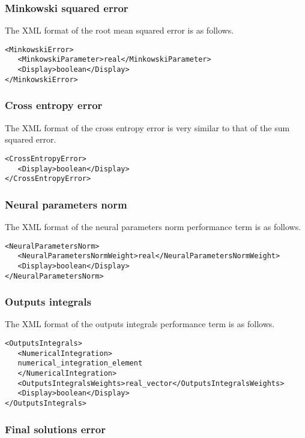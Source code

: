 \subsubsection*{Minkowski squared error}

The XML format of the root mean squared error is as follows.

\begin{lstlisting}
<MinkowskiError>
   <MinkowskiParameter>real</MinkowskiParameter>
   <Display>boolean</Display>
</MinkowskiError>
\end{lstlisting}

\subsubsection*{Cross entropy error}

The XML format of the cross entropy error is very similar to that of the sum squared error.

\begin{lstlisting}
<CrossEntropyError>
   <Display>boolean</Display>
</CrossEntropyError>
\end{lstlisting}

\subsubsection*{Neural parameters norm}

The XML format of the neural parameters norm performance term is as follows.

\begin{lstlisting}
<NeuralParametersNorm>
   <NeuralParametersNormWeight>real</NeuralParametersNormWeight>
   <Display>boolean</Display>
</NeuralParametersNorm>
\end{lstlisting}

\subsubsection*{Outputs integrals}

The XML format of the outputs integrals performance term is as follows.

\begin{lstlisting}
<OutputsIntegrals>
   <NumericalIntegration>
   numerical_integration_element
   </NumericalIntegration>
   <OutputsIntegralsWeights>real_vector</OutputsIntegralsWeights>
   <Display>boolean</Display>
</OutputsIntegrals>
\end{lstlisting}

\subsubsection*{Final solutions error}

